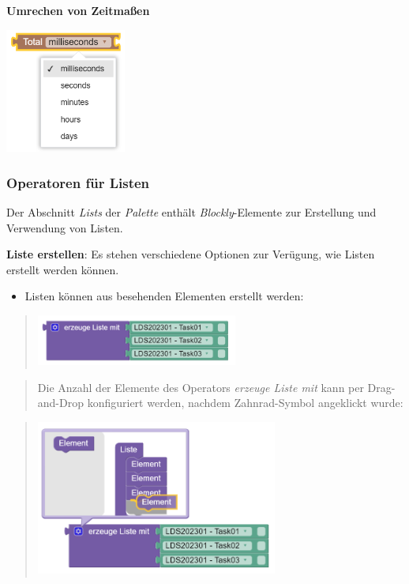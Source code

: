 \documentclass[
  letterpaper,
  DIV=11]{scrreprt}
\providecommand{\tightlist}{%
  \setlength{\itemsep}{0pt}\setlength{\parskip}{0pt}}\usepackage{longtable,booktabs,array}
\begin{document}
\begin{tcolorbox}
\textbf{Umrechen von Zeitmaßen}

\includegraphics[width=1.5625in,height=\textheight]{img/screenshot-blockly-time-total-seconds-example-01-ENG.png}

\hypertarget{operatoren-fuxfcr-listen-1}{%
\subsubsection{Operatoren für Listen}\label{operatoren-fuxfcr-listen-1}}

Der Abschnitt \emph{Lists} der \emph{Palette} enthält
\emph{Blockly}-Elemente zur Erstellung und Verwendung von Listen.

\textbf{Liste erstellen}: Es stehen verschiedene Optionen zur Verügung,
wie Listen erstellt werden können.

\begin{itemize}
\tightlist
\item
  Listen können aus besehenden Elementen erstellt werden:
\end{itemize}

\begin{quote}
\includegraphics[width=2.60417in,height=\textheight]{img/screenshot-create-list-block-lds2023-01-example-01-DEU.png}
\end{quote}

\begin{quote}
Die Anzahl der Elemente des Operators \emph{erzeuge Liste mit} kann per
Drag-and-Drop konfiguriert werden, nachdem Zahnrad-Symbol angeklickt
wurde:
\end{quote}

\begin{quote}
\includegraphics[width=3.125in,height=\textheight]{img/screenshot-configure-list-block-lds2023-01-example-01-DEU.png}
\end{quote}


\end{tcolorbox}
\end{document}
